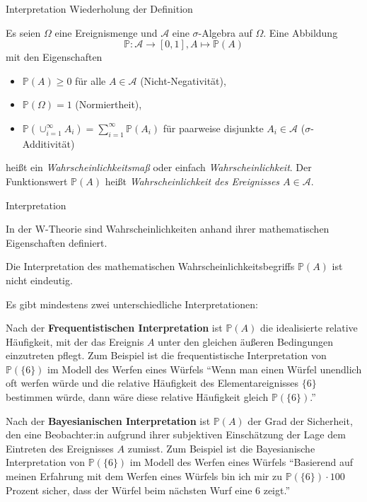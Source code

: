 \documentclass[
  8pt,
  ignorenonframetext,
]{beamer}
\begin{document}
\begin{frame}{Interpretation}
\protect\hypertarget{interpretation}{}
Wiederholung der Definition

\small

Es seien \(\Omega\) eine Ereignismenge und \(\mathcal{A}\) eine
\(\sigma\)-Algebra auf \(\Omega\). Eine Abbildung \begin{equation}
\mathbb{P} : \mathcal{A} \to [0,1], A \mapsto \mathbb{P}(A)
\end{equation} mit den Eigenschaften

\begin{itemize}
\item $\mathbb{P}(A) \ge 0$ für alle $A \in \mathcal{A}$ (Nicht-Negativität),
\item $\mathbb{P}(\Omega) = 1$ (Normiertheit),
\item $\mathbb{P}\left(\cup_{i=1}^\infty A_i\right) = \sum_{i=1}^\infty \mathbb{P}(A_i)$
für paarweise disjunkte $A_i \in \mathcal{A}$ ($\sigma$-Additivität)
\end{itemize}

heißt ein \textit{Wahrscheinlichkeitsmaß} oder einfach
\textit{Wahrscheinlichkeit}. Der Funktionswert \(\mathbb{P}(A)\) heißt
\textit{Wahrscheinlichkeit des Ereignisses
$A \in \mathcal{A}$}.
\end{frame}

\begin{frame}{Interpretation}
\protect\hypertarget{interpretation-1}{}
\small

In der W-Theorie sind Wahrscheinlichkeiten anhand ihrer mathematischen
Eigenschaften definiert.

Die Interpretation des mathematischen Wahrscheinlichkeitsbegriffs
\(\mathbb{P}(A)\) ist nicht eindeutig.

Es gibt mindestens zwei unterschiedliche Interpretationen:

Nach der \textbf{Frequentistischen Interpretation} ist \(\mathbb{P}(A)\)
die idealisierte relative Häufigkeit, mit der das Ereignis \(A\) unter
den gleichen äußeren Bedingungen einzutreten pflegt. Zum Beispiel ist
die frequentistische Interpretation von \(\mathbb{P}(\{6\})\) im Modell
des Werfen eines Würfels ``Wenn man einen Würfel unendlich oft werfen
würde und die relative Häufigkeit des Elementareignisses \(\{6\}\)
bestimmen würde, dann wäre diese relative Häufigkeit gleich
\(\mathbb{P}(\{6\})\).''

Nach der \textbf{Bayesianischen Interpretation} ist \(\mathbb{P}(A)\)
der Grad der Sicherheit, den eine Beobachter:in aufgrund ihrer
subjektiven Einschätzung der Lage dem Eintreten des Ereignisses \(A\)
zumisst. Zum Beispiel ist die Bayesianische Interpretation von
\(\mathbb{P}(\{6\})\) im Modell des Werfen eines Würfels ``Basierend auf
meinen Erfahrung mit dem Werfen eines Würfels bin ich mir zu
\(\mathbb{P}(\{6\})\cdot 100\) Prozent sicher, dass der Würfel beim
nächsten Wurf eine 6 zeigt.''
\end{frame}
\end{document}
